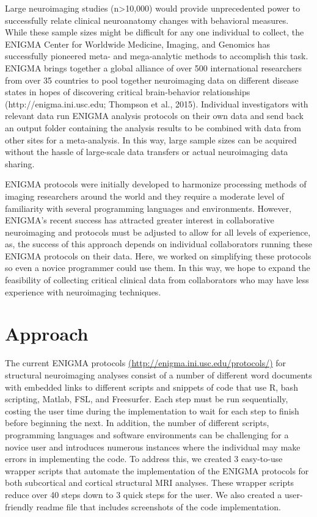 \documentclass[twocolumn]{bmcart}%
\begin{document}
Large neuroimaging studies (n\textgreater{}10,000) would provide
unprecedented power to successfully relate clinical neuroanatomy changes
with behavioral measures. While these sample sizes might be difficult
for any one individual to collect, the ENIGMA Center for Worldwide
Medicine, Imaging, and Genomics has successfully pioneered meta- and
mega-analytic methods to accomplish this task. ENIGMA brings together a
global alliance of over 500 international researchers from over 35
countries to pool together neuroimaging data on different disease states
in hopes of discovering critical brain-behavior relationships
(http://enigma.ini.usc.edu; Thompson et al., 2015). Individual
investigators with relevant data run ENIGMA analysis protocols on their
own data and send back an output folder containing the analysis results
to be combined with data from other sites for a meta-analysis. In this
way, large sample sizes can be acquired without the hassle of
large-scale data transfers or actual neuroimaging data sharing.

ENIGMA protocols were initially developed to harmonize processing
methods of imaging researchers around the world and they require a
moderate level of familiarity with several programming languages and
environments. However, ENIGMA's recent success has attracted greater
interest in collaborative neuroimaging and protocols must be adjusted to
allow for all levels of experience, as, the success of this approach
depends on individual collaborators running these ENIGMA protocols on
their data. Here, we worked on simplifying these protocols so even a
novice programmer could use them. In this way, we hope to expand the
feasibility of collecting critical clinical data from collaborators who
may have less experience with neuroimaging techniques.

\section{Approach}\label{approach}

The current ENIGMA protocols \url{(http://enigma.ini.usc.edu/protocols/)} for
structural neuroimaging analyses consist of a number of different word
documents with embedded links to different scripts and snippets of code
that use R, bash scripting, Matlab, FSL, and Freesurfer. Each step must
be run sequentially, costing the user time during the implementation to
wait for each step to finish before beginning the next. In addition, the
number of different scripts, programming languages and software
environments can be challenging for a novice user and introduces
numerous instances where the individual may make errors in implementing
the code. To address this, we created 3 easy-to-use wrapper scripts
that automate the implementation of the ENIGMA protocols for both
subcortical and cortical structural MRI analyses. These wrapper scripts
reduce over 40 steps down to 3 quick steps for the user. We also created
a user-friendly readme file that includes screenshots of the code
implementation.
\end{document}
